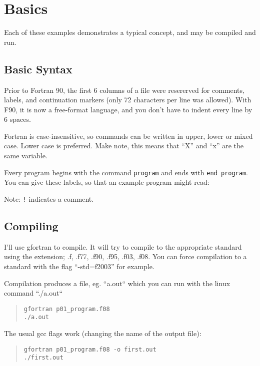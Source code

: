 

\section{Basics}

Each of these examples demonstrates a typical concept, and may be compiled and run.

\subsection{Basic Syntax}
Prior to Fortran 90, the first 6 columns of a file were resererved for comments, labels, and continuation markers (only 72 characters per line was allowed). With F90, it is now a free-format language, and you don't have to indent every line by 6 spaces.

Fortran is case-insensitive, so commands can be written in upper, lower or mixed case. Lower case is preferred. Make note, this means that ``X'' and ``x'' are the same variable. 

Every program begins with the command \texttt{program} and ends with \texttt{end program}. You can give these labels, so that an example program might read:
\begin{quote}

\end{quote}
Note: \texttt{!} indicates a comment.

\subsection{Compiling}
I'll use gfortran to compile. It will try to compile to the appropriate standard using the extension; .f, .f77, .f90, .f95, .f03, .f08. You can force compilation to a standard with the flag ``-std=f2003'' for example.

Compilation produces a file, eg. ``a.out`` which you can run with the linux command ``./a.out``
\begin{quote}
\begin{verbatim}
gfortran p01_program.f08
./a.out
\end{verbatim}
\end{quote}

The usual gcc flags work (changing the name of the output file):
\begin{quote}
\begin{verbatim}
gfortran p01_program.f08 -o first.out
./first.out
\end{verbatim}
\end{quote}

